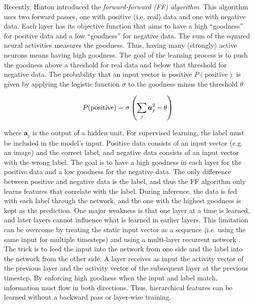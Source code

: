 Recently, Hinton  introduced the \emph{forward-forward (FF) algorithm}.
This algorithm uses two forward passes, one with positive (i.e. real) data and one with negative data.
Each layer has its objective function that aims to have a high ``goodness'' for positive data and a low ``goodness'' for negative data. 
The sum of the squared neural activities measures the goodness. Thus, having many (strongly) active neurons means having high goodness.
The goal of the learning process is to push the goodness above a threshold for real data and below that threshold for negative data.
The probability that an input vector is positive $P(\text{positive}
)$ is given by applying the logistic function $\sigma$ to the goodness minus the threshold $\theta$

\begin{align}\eqlbl{ff2}
	P(\text{positive}) = \sigma \left( \sum_j \boldsymbol{a}^2_j - \theta \right)
\end{align}

where $\boldsymbol{a}_j$ is the output of a hidden unit.
For supervised learning, the label must be included in the model's input.
Positive data consists of an input vector (e.g. an image) and the correct label, and negative data consists of an input vector with the wrong label.
The goal is to have a high goodness in each layer for the positive data and a low goodness for the negative data.
The only difference between positive and negative data is the label, and thus the FF algorithm only learns features that correlate with the label.
During inference, the data is fed with each label through the network, and the one with the highest goodness is kept as the prediction.
One major weakness is that one layer at a time is learned, and later layers cannot influence what is learned in earlier layers.
This limitation can be overcome by treating the static input vector as a sequence (i.e. using the same input for multiple timesteps) and using a multi-layer recurrent network .
The trick is to feed the input into the network from one side and the label into the network from the other side. A layer receives as input the activity vector of the previous layer and the activity vector of the subsequent layer at the previous timestep. By enforcing high goodness when the input and label match, information must flow in both directions. Thus, hierarchical features can be learned without a backward pass or layer-wise training.


